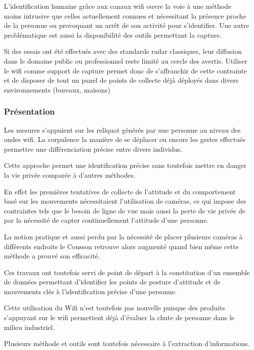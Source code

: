 \documentclass[conference,compsoc]{IEEEtran}
\begin{document}
L'identification humaine grâce aux canaux wifi ouvre la voie à une méthode moins intrusive que celles actuellement connues et nécessitant la présence proche de la personne ou provoquant un arrêt de son activité pour s'identifier. Une autre problématique est aussi la disponibilité des outils permettant la capture.

Si des essais ont été effectués avec des standards radar classiques, leur diffusion dans le domaine public ou professionnel reste limité au cercle des avertis. Utiliser le wifi comme support de capture permet donc de s'affranchir de cette contrainte et de disposer de tout un panel de points de collecte déjà déployés dans divers environnements (bureaux, maisons)

\subsubsection{Présentation}

Les mesures s'appuient sur les reliquat générés par une personne au niveau des ondes wifi. La corpulence la manière de se déplacer ou encore les gestes effectués permettre une différenciation précise entre divers individus.

Cette approche permet une identification précise sans toutefois mettre en danger la vie privée comparée à d'autres méthodes.

En effet les premières tentatives de collecte de l'attitude et du comportement basé sur les mouvements nécessitaient l'utilisation de caméras, ce qui impose des contraintes tels que le besoin de ligne de vue mais aussi la perte de vie privée de par la nécessité de capter continuellement l'attitude d'une personne.

La notion pratique et aussi perdu par la nécessité de placer plusieurs caméras à différents endroits le Cousson retrouve alors augmenté quand bien même cette méthode a prouvé son efficacité.

Ces travaux ont toutefois servi de point de départ à la constitution d'un ensemble de données permettant d'identifier les points de posture d'attitude et de mouvements clés à l'identification précise d'une personne.

Cette utilisation du Wifi n'est toutefois pas nouvelle puisque des produits s'appuyant sur le wifi permettent déjà d'évaluer la chute de personne dans le milieu industriel.

Plusieurs méthode et outils sont toutefois nécessaire à l'extraction d'informations.
\end{document}
